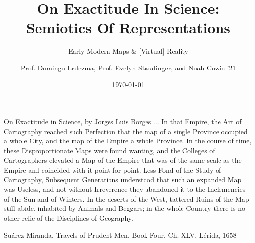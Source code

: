 \documentclass{beamer}
\title{On Exactitude In Science: Semiotics Of Representations}
\subtitle{Early Modern Maps \& [Virtual] Reality}
\author{Prof. Domingo Ledezma, Prof. Evelyn Staudinger, and Noah Cowie '21}
\date{\today}
\begin{document}
\maketitle

\begin{frame}{On Exactitude in Science, by Jorges Luis Borges}
	... In that Empire, the Art of Cartography reached such Perfection that the map of a single
	Province occupied a whole City, and the map of the Empire a whole Province. In the course
	of time, these Disproportionate Maps were found wanting, and the Colleges of Cartographers
	elevated a Map of the Empire that was of the same scale as the Empire and coincided with it
	point for point. Less Fond of the Study of Cartography, Subsequent Generations understood
	that such an expanded Map was Useless, and not without Irreverence they abandoned it to the
	Inclemencies of the Sun and of Winters. In the deserts of the West, tattered Ruins of the Map
	still abide, inhabited by Animals and Beggars; in the whole Country there is no other relic of
	the Disciplines of Geography.\par

	\hfill Su\'arez Miranda, Travels of Prudent Men, Book Four, Ch. XLV, L\'erida, 1658\par
\end{frame}
\end{document}
